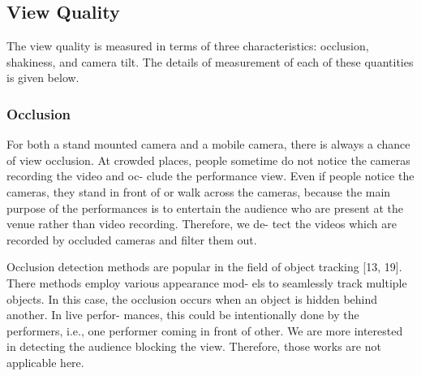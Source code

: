 \documentclass{sig-alternate}
\begin{document}
\subsection{View Quality}
The view quality is measured in terms of three characteristics:
occlusion, shakiness, and camera tilt. The details of measurement
of each of these quantities is given below.
\subsubsection{{Occlusion}}
For both a stand mounted camera and a mobile camera, there
is always a chance of view occlusion. At crowded places, people
sometime do not notice the cameras recording the video and oc-
clude the performance view. Even if people notice the cameras,
they stand in front of or walk across the cameras, because the main
purpose of the performances is to entertain the audience who are
present at the venue rather than video recording. Therefore, we de-
tect the videos which are recorded by occluded cameras and filter
them out.

Occlusion detection methods are popular in the field of object
tracking [13, 19]. There methods employ various appearance mod-
els to seamlessly track multiple objects. In this case, the occlusion
occurs when an object is hidden behind another. In live perfor-
mances, this could be intentionally done by the performers, i.e.,
one performer coming in front of other. We are more interested in
detecting the audience blocking the view. Therefore, those works
are not applicable here.
\end{document}
